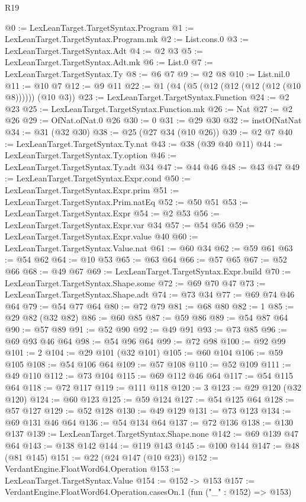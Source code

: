 \begin{lexlean}{R19}
\begin{coremodule}
@0 := LexLeanTarget.TargetSyntax.Program
@1 := LexLeanTarget.TargetSyntax.Program.mk
@2 := List.cons.{0}
@3 := LexLeanTarget.TargetSyntax.Adt
@4 := @2 @3
@5 := LexLeanTarget.TargetSyntax.Adt.mk
@6 := List.{0}
@7 := LexLeanTarget.TargetSyntax.Ty
@8 := @6 @7
@9 := @2 @8
@10 := List.nil.{0}
@11 := @10 @7
@12 := @9 @11
@22 := @1 (@4 (@5 (@12 (@12 (@12 (@12 (@10 @8)))))) (@10 @3))
@23 := LexLeanTarget.TargetSyntax.Function
@24 := @2 @23
@25 := LexLeanTarget.TargetSyntax.Function.mk
@26 := Nat
@27 := @2 @26
@29 := OfNat.ofNat.{0} @26
@30 := 0
@31 := @29 @30
@32 := instOfNatNat
@34 := @31 (@32 @30)
@38 := @25 (@27 @34 (@10 @26))
@39 := @2 @7
@40 := LexLeanTarget.TargetSyntax.Ty.nat
@43 := @38 (@39 @40 @11)
@44 := LexLeanTarget.TargetSyntax.Ty.option
@46 := LexLeanTarget.TargetSyntax.Ty.adt @34
@47 := @44 @46
@48 := @43 @47
@49 := LexLeanTarget.TargetSyntax.Expr.cond
@50 := LexLeanTarget.TargetSyntax.Expr.prim
@51 := LexLeanTarget.TargetSyntax.Prim.natEq
@52 := @50 @51
@53 := LexLeanTarget.TargetSyntax.Expr
@54 := @2 @53
@56 := LexLeanTarget.TargetSyntax.Expr.var @34
@57 := @54 @56
@59 := LexLeanTarget.TargetSyntax.Expr.value @40
@60 := LexLeanTarget.TargetSyntax.Value.nat
@61 := @60 @34
@62 := @59 @61
@63 := @54 @62
@64 := @10 @53
@65 := @63 @64
@66 := @57 @65
@67 := @52 @66
@68 := @49 @67
@69 := LexLeanTarget.TargetSyntax.Expr.build
@70 := LexLeanTarget.TargetSyntax.Shape.some
@72 := @69 @70 @47
@73 := LexLeanTarget.TargetSyntax.Shape.adt
@74 := @73 @34
@77 := @69 @74 @46 @64
@79 := @54 @77 @64
@80 := @72 @79
@81 := @68 @80
@82 := 1
@85 := @29 @82 (@32 @82)
@86 := @60 @85
@87 := @59 @86
@89 := @54 @87 @64
@90 := @57 @89
@91 := @52 @90
@92 := @49 @91
@93 := @73 @85
@96 := @69 @93 @46 @64
@98 := @54 @96 @64
@99 := @72 @98
@100 := @92 @99
@101 := 2
@104 := @29 @101 (@32 @101)
@105 := @60 @104
@106 := @59 @105
@108 := @54 @106 @64
@109 := @57 @108
@110 := @52 @109
@111 := @49 @110
@112 := @73 @104
@115 := @69 @112 @46 @64
@117 := @54 @115 @64
@118 := @72 @117
@119 := @111 @118
@120 := 3
@123 := @29 @120 (@32 @120)
@124 := @60 @123
@125 := @59 @124
@127 := @54 @125 @64
@128 := @57 @127
@129 := @52 @128
@130 := @49 @129
@131 := @73 @123
@134 := @69 @131 @46 @64
@136 := @54 @134 @64
@137 := @72 @136
@138 := @130 @137
@139 := LexLeanTarget.TargetSyntax.Shape.none
@142 := @69 @139 @47 @64
@143 := @138 @142
@144 := @119 @143
@145 := @100 @144
@147 := @48 (@81 @145)
@151 := @22 (@24 @147 (@10 @23))
@152 := VerdantEngine.FloatWord64.Operation
@153 := LexLeanTarget.TargetSyntax.Value
@154 := @152 -> @153
@157 := VerdantEngine.FloatWord64.Operation.casesOn.{1} (fun ("_" : @152) => @153)

\end{coremodule}
\end{lexlean}
